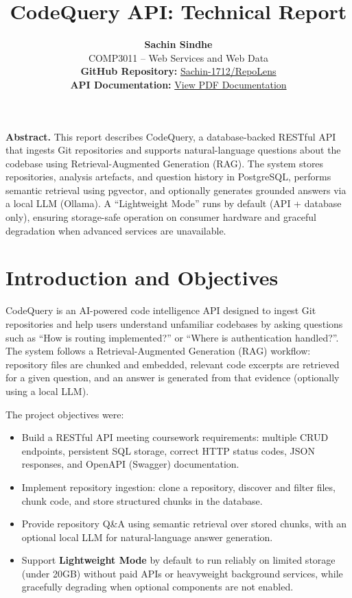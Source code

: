 \documentclass[11pt,a4paper]{article}
\title{\textbf{CodeQuery API: Technical Report}}
\author{
  \textbf{Sachin Sindhe}\\
  COMP3011 -- Web Services and Web Data\\[0.5em]
  \textbf{GitHub Repository:} \href{https://github.com/Sachin-1712/RepoLens}{Sachin-1712/RepoLens}\\
  \textbf{API Documentation:} \href{https://github.com/Sachin-1712/RepoLens/blob/main/api-docs.pdf}{View PDF Documentation}
}
\date{}
\begin{document}
\maketitle

\vspace{-0.5em}
\begin{center}
\textbf{Abstract.}
This report describes CodeQuery, a database-backed RESTful API that ingests Git repositories and supports natural-language questions about the codebase using Retrieval-Augmented Generation (RAG). The system stores repositories, analysis artefacts, and question history in PostgreSQL, performs semantic retrieval using pgvector, and optionally generates grounded answers via a local LLM (Ollama). A ``Lightweight Mode'' runs by default (API + database only), ensuring storage-safe operation on consumer hardware and graceful degradation when advanced services are unavailable.
\end{center}

\section{Introduction and Objectives}
CodeQuery is an AI-powered code intelligence API designed to ingest Git repositories and help users understand unfamiliar codebases by asking questions such as ``How is routing implemented?'' or ``Where is authentication handled?''. The system follows a Retrieval-Augmented Generation (RAG) workflow: repository files are chunked and embedded, relevant code excerpts are retrieved for a given question, and an answer is generated from that evidence (optionally using a local LLM).

The project objectives were:
\begin{itemize}[leftmargin=1.2em]
  \item Build a RESTful API meeting coursework requirements: multiple CRUD endpoints, persistent SQL storage, correct HTTP status codes, JSON responses, and OpenAPI (Swagger) documentation.
  \item Implement repository ingestion: clone a repository, discover and filter files, chunk code, and store structured chunks in the database.
  \item Provide repository Q\&A using semantic retrieval over stored chunks, with an optional local LLM for natural-language answer generation.
  \item Support \textbf{Lightweight Mode} by default to run reliably on limited storage (under 20GB) without paid APIs or heavyweight background services, while gracefully degrading when optional components are not enabled.
\end{itemize}
\end{document}
